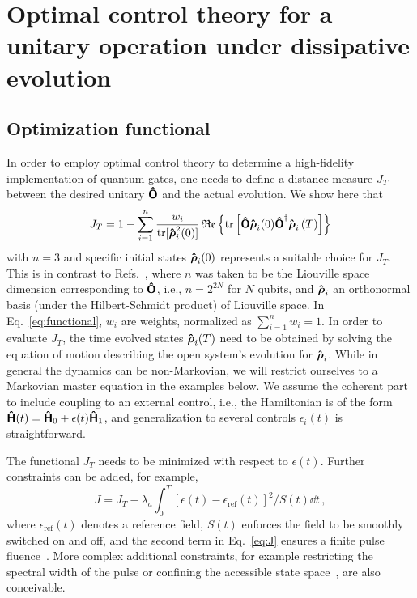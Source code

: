 \section[OCT for a unitary operation under
  dissipative  evolution]{Optimal control theory for a unitary operation under
  dissipative  evolution}
\label{sec:oct}

\subsection{Optimization functional}
\label{subsec:func}
In order to employ optimal control theory to determine a
high-fidelity implementation of quantum gates, one needs to 
define a distance measure $J_T $
between the desired unitary $\boldsymbol{\mathsf{\hat{O}}}$ and the actual evolution. We show
here that 
\begin{equation}
  J_T = 1 - \sum_{i=1}^{n}
    \frac{w_i}{\operatorname{tr}[\boldsymbol{\mathsf{\hat{\rho}}}_i^2(0)]} \, \mathfrak{Re}\left\{\operatorname{tr}\left[
    \boldsymbol{\mathsf{\hat{O}}}\boldsymbol{\mathsf{\hat{\rho}}}_{i}(0)\boldsymbol{\mathsf{\hat{O}}}^{\dagger}\boldsymbol{\mathsf{\hat{\rho}}}_{i}\left(T\right)\right]\right\}
  \label{eq:functional}
\end{equation}
with $n=3$ and specific initial states $\boldsymbol{\mathsf{\hat{\rho}}}_i(0)$ represents
a suitable choice for $J_T$. This is in contrast to
Refs.~\cite{KallushPRA06,OhtsukiNJP10,ToSHJPB11}, where $n$ was taken
to be the Liouville space dimension corresponding to $\boldsymbol{\mathsf{\hat{O}}}$, 
i.e., $n=2^{2N}$ for $N$ qubits,
and $\boldsymbol{\mathsf{\hat{\rho}}}_i$ an orthonormal basis (under the Hilbert-Schmidt
product) of Liouville space.
In Eq.~\eqref{eq:functional}, $w_i$ are  weights,
normalized as $\sum_{i=1}^n w_i = 1$. In order to evaluate $J_T$, 
the time evolved states $\boldsymbol{\mathsf{\hat{\rho}}}_i(T)$
need to be obtained by solving the equation of motion describing the open
system's evolution for $\boldsymbol{\mathsf{\hat{\rho}}}_i$. While in general the dynamics can
be non-Markovian, we will restrict ourselves to a Markovian master
equation in the examples below. We assume the coherent part to include
coupling to 
an external control, i.e., the Hamiltonian is of the form $\boldsymbol{\mathsf{\hat{H}}}(t)=\boldsymbol{\mathsf{\hat{H}}}_0 + \epsilon(t)\boldsymbol{\mathsf{\hat{H}}}_1$, and generalization to several
controls $\epsilon_i(t)$ is straightforward.

The functional $J_T$ needs to be minimized
with respect to $\epsilon(t)$.
Further constraints can be added, for example,
\begin{equation}
  \label{eq:J}
  J = J_T -
  \lambda_a\int_0^T\left[\epsilon(t)-\epsilon_{\text{ref}}(t)\right]^2/S(t) \dd t\,,
\end{equation}
where $\epsilon_{\text{ref}}(t)$ denotes a reference field, $S(t)$ enforces
the field to be smoothly switched on and off,
and the second term in Eq.~\eqref{eq:J} ensures a finite pulse
fluence~\cite{JosePRA03}. More complex additional constraints, for
example restricting the spectral width of the pulse or confining the
accessible state space~\cite{ReichKochJMO13,JosePRA13}, are also
conceivable. 
 
